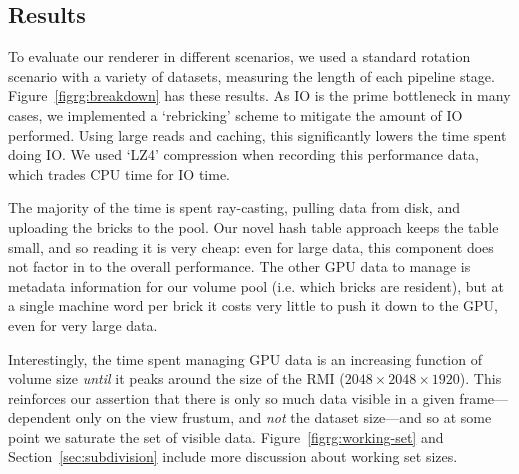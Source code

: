 \subsection{Results}
\label{sec:results}

To evaluate our renderer in different scenarios, we used a standard
rotation scenario with a variety of datasets, measuring the length of
each pipeline stage.  Figure~\ref{figrg:breakdown} has these results.  As
IO is the prime bottleneck in many cases, we implemented a `rebricking'
scheme to mitigate the amount of IO performed.  Using large reads and
caching, this significantly lowers the time spent doing IO.  We used
`LZ4' compression when recording this performance data, which trades
CPU time for IO time.

The majority of the time is spent ray-casting, pulling data from disk,
and uploading the bricks to the pool.  Our novel hash table approach
keeps the table small, and so reading it is very cheap: even for large
data, this component does not factor in to the overall performance.
The other GPU data to manage is metadata information for our volume
pool (i.e. which bricks are resident), but at a single machine word per
brick it costs very little to push it down to the GPU, even for very
large data.

Interestingly, the time spent managing GPU data is an increasing
function of volume size \emph{until} it peaks around the size of the
RMI ($2048\times2048\times1920$).  This reinforces our assertion that
there is only so much data visible in a given frame---dependent only on
the view
frustum, and \emph{not} the dataset size---and so at some point we
saturate the set of visible data.  Figure~\ref{figrg:working-set} and
Section~\ref{sec:subdivision} include more discussion about working set
sizes.



